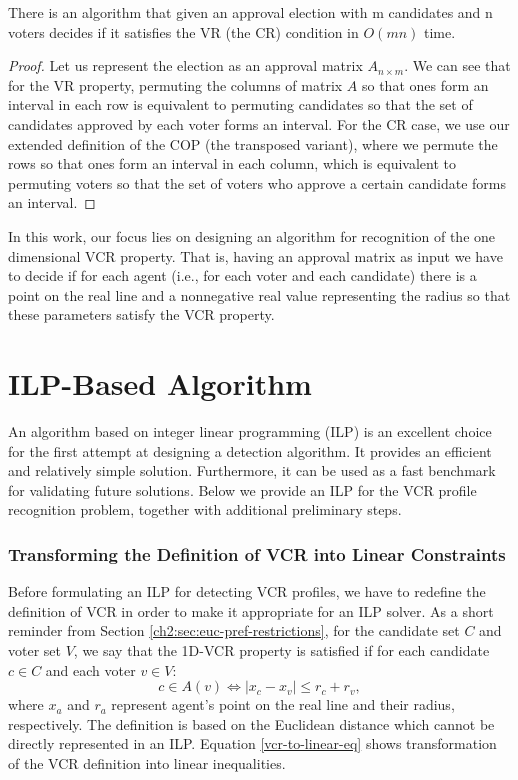 \begin{proposition}\label{ch3:sec1:vr-cop-propostion}
There is an algorithm that given an approval election with m candidates and n voters
decides if it satisfies the VR (the CR) condition in $O(mn)$ time.
\end{proposition}

\begin{proof}
Let us represent the election as an approval matrix $A_{n \times m}$.
We can see that for the VR property, permuting the columns of matrix $A$ so that ones form an interval in each row is equivalent 
to permuting candidates so that the set of candidates approved by each voter forms an interval.
For the CR case, we use our extended definition of the COP (the transposed variant),
where we permute the rows so that ones form an interval in each column,
which is equivalent to permuting voters so that the set of voters who approve a certain candidate forms an interval.  
\end{proof}

In this work, our focus lies on designing an algorithm for recognition of the one dimensional VCR property. 
That is, having an approval matrix as input we have to decide if 
for each agent (i.e., for each voter and each candidate) there is a point on the real line 
and a nonnegative real value representing the radius so that these parameters satisfy the VCR property.  


\section{ILP-Based Algorithm}\label{ch3:sec2:ilp}
An algorithm based on integer linear programming (ILP) is an excellent choice for the first attempt
at designing a detection algorithm. It provides an efficient and relatively simple solution.
Furthermore, it can be used as a fast benchmark for validating future solutions.
Below we provide an ILP for the VCR profile recognition problem, together with additional preliminary steps.

\subsubsection{Transforming the Definition of VCR into Linear Constraints}
Before formulating an ILP for detecting VCR profiles,
we have to redefine the definition of VCR in order to make it appropriate for an ILP solver.
As a short reminder from Section \ref{ch2:sec:euc-pref-restrictions}, for the candidate set $C$ and voter set $V$, 
we say that the 1D-VCR property is satisfied if for each candidate $c \in C$ and each voter $v \in V$:
\[c \in A(v) \Leftrightarrow |x_c - x_v| \leq r_c + r_v,\]
where $x_a$ and $r_a$ represent agent's point on the real line and their radius, respectively.
The definition is based on the Euclidean distance which cannot be directly represented in an ILP.
Equation \ref{vcr-to-linear-eq} shows transformation of the VCR definition into 
linear inequalities.

